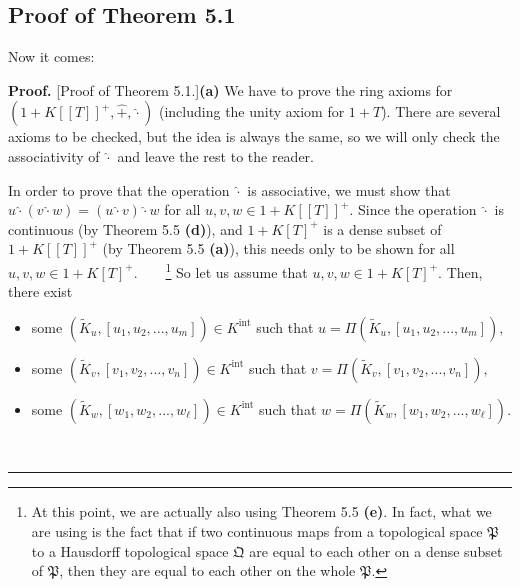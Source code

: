 \documentclass[numbers=enddot,12pt,final,onecolumn,notitlepage]{scrartcl}%
\newenvironment{proof}[1][Proof]{\noindent\textbf{#1.} }{\ \rule{0.5em}{0.5em}}
\begin{document}
\subsection{Proof of Theorem 5.1}

Now it comes:

\begin{proof}
[Proof of Theorem 5.1.]\textbf{(a)} We have to prove the ring axioms for
$\left(  1+K\left[  \left[  T\right]  \right]  ^{+},\widehat{+},\widehat{\cdot
}\right)  $ (including the unity axiom for $1+T$). There are several axioms to
be checked, but the idea is always the same, so we will only check the
associativity of $\widehat{\cdot}$ and leave the rest to the reader.

In order to prove that the operation $\widehat{\cdot}$ is associative, we must
show that $u\widehat{\cdot}\left(  v\widehat{\cdot}w\right)  =\left(
u\widehat{\cdot}v\right)  \widehat{\cdot}w$ for all $u,v,w\in1+K\left[
\left[  T\right]  \right]  ^{+}$. Since the operation $\widehat{\cdot}$ is
continuous (by Theorem 5.5 \textbf{(d)}), and $1+K\left[  T\right]  ^{+}$ is a
dense subset of $1+K\left[  \left[  T\right]  \right]  ^{+}$ (by Theorem 5.5
\textbf{(a)}), this needs only to be shown for all $u,v,w\in1+K\left[
T\right]  ^{+}$.\ \ \ \ \footnote{At this point, we are actually also using
Theorem 5.5 \textbf{(e)}. In fact, what we are using is the fact that if two
continuous maps from a topological space $\mathfrak{P}$ to a Hausdorff
topological space $\mathfrak{Q}$ are equal to each other on a dense subset of
$\mathfrak{P}$, then they are equal to each other on the whole $\mathfrak{P}%
$.} So let us assume that $u,v,w\in1+K\left[  T\right]  ^{+}$. Then, there exist

\begin{itemize}
\item some $\left(  \widetilde{K}_{u},\left[  u_{1},u_{2},...,u_{m}\right]
\right)  \in K^{\operatorname*{int}}$ such that $u=\Pi\left(  \widetilde{K}%
_{u},\left[  u_{1},u_{2},...,u_{m}\right]  \right)  ,$

\item some $\left(  \widetilde{K}_{v},\left[  v_{1},v_{2},...,v_{n}\right]
\right)  \in K^{\operatorname*{int}}$ such that $v=\Pi\left(  \widetilde{K}%
_{v},\left[  v_{1},v_{2},...,v_{n}\right]  \right)  ,$

\item some $\left(  \widetilde{K}_{w},\left[  w_{1},w_{2},...,w_{\ell}\right]
\right)  \in K^{\operatorname*{int}}$ such that $w=\Pi\left(  \widetilde{K}%
_{w},\left[  w_{1},w_{2},...,w_{\ell}\right]  \right)  $.
\end{itemize}


\end{proof}
\end{document}
